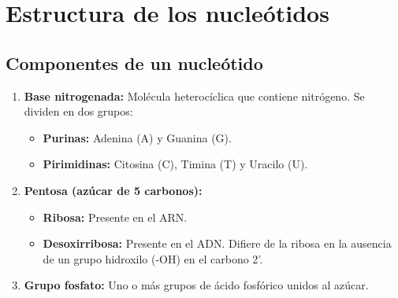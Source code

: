 
\section{Estructura de los nucleótidos}


\subsection{Componentes de un nucleótido}
\begin{enumerate}
    \item \textbf{Base nitrogenada:} Molécula heterocíclica que contiene nitrógeno. Se dividen en dos grupos:
    \begin{itemize}
        \item \textbf{Purinas:} Adenina (A) y Guanina (G).
        \item \textbf{Pirimidinas:} Citosina (C), Timina (T) y Uracilo (U).
    \end{itemize}
    \item \textbf{Pentosa (azúcar de 5 carbonos):}
    \begin{itemize}
        \item \textbf{Ribosa:} Presente en el ARN.
        \item \textbf{Desoxirribosa:} Presente en el ADN. Difiere de la ribosa en la ausencia de un grupo hidroxilo (-OH) en el carbono 2'.
    \end{itemize}
    \item \textbf{Grupo fosfato:} Uno o más grupos de ácido fosfórico unidos al azúcar.
\end{enumerate}


